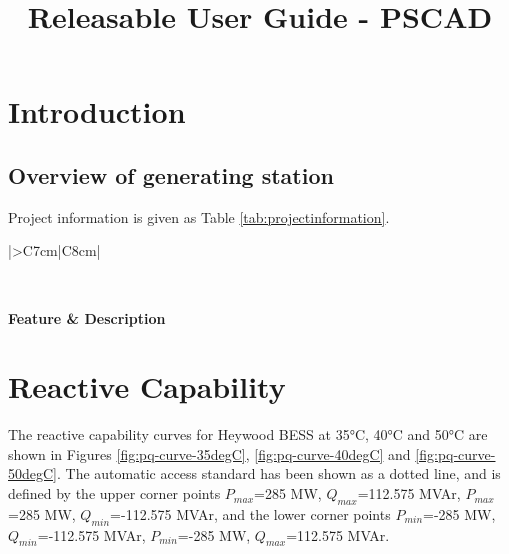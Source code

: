 \documentclass{../grid-link-report}
\title{Releasable User Guide - PSCAD}
\newcommand{\projectassetsdir}{../project-assets}
\begin{document}
	
	\frontmatter
	\maketitle
	
	\makedisclaimer
	\clearpage
	\tableofcontents
	\makerevisionhistorypage
	
	\mainmatter
	
	\chapter{Introduction}

	\section{Overview of generating station }
	
	
	Project information is given as Table \ref{tab:projectinformation}.
	
{	
	\thicktablelines
	\begin{longtable}{|>{}C{7cm}|C{8cm}|}
		\caption{Project Information}
		\label{tab:projectinformation} \\
		\toprule
		
		\bfseries \color{white}Feature & \bfseries \color{white}Description \\
		\endhead
		\bottomrule \endfoot
	\end{longtable}
	
}
	
	
		\chapter{Reactive Capability}
	The reactive capability curves for \ac{Heywood BESS} at 35°C, 40°C and 50°C are shown in Figures \ref{fig:pq-curve-35degC}, \ref{fig:pq-curve-40degC} and \ref{fig:pq-curve-50degC}. The automatic access standard has been shown as a dotted line, and is defined by the upper corner points $P_{max}$=285 MW, $Q_{max}$=112.575 MVAr, $P_{max}$=285 MW, $Q_{min}$=-112.575 MVAr, and the lower corner points $P_{min}$=-285 MW, $Q_{min}$=-112.575 MVAr, $P_{min}$=-285 MW, $Q_{max}$=112.575 MVAr.
	
\end{document}
